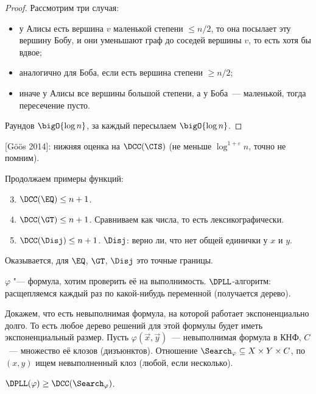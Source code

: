 \begin{proof}
    Рассмотрим три случая:
    \begin{itemize}
        \item у Алисы есть вершина $v$ маленькой степени $\leq n / 2$, то она посылает эту вершину
            Бобу, и они уменьшают граф до соседей вершины $v$, то есть хотя бы вдвое;
        \item аналогично для Боба, если есть вершина степени $\geq n / 2$;
        \item иначе у Алисы все вершины большой степени, а у Боба~--- маленькой, тогда пересечение пусто.
    \end{itemize}

    Раундов $\bigO{\log n}$, за каждый пересылаем $\bigO{\log n}$.
\end{proof}

[G{\"{o}}{\"{o}}s 2014]: нижняя оценка на $\DCC(\CIS)$ (не меньше $\log^{1 + \varepsilon} n$, точно не помним).

Продолжаем примеры функций:
\begin{enumerate}
        \setcounter{enumi}{2}
    \item $\DCC(\EQ) \leq n + 1$.
    \item $\DCC(\GT) \leq n + 1$.
        Сравниваем как числа, то есть лексикографически.
    \item $\DCC(\Disj) \leq n + 1$. $\Disj$: верно ли, что нет общей единички у $x$ и $y$.
\end{enumerate}

Оказывается, для $\EQ$, $\GT$, $\Disj$ это точные границы.



$\varphi$ "--- формула, хотим проверить её на выполнимость. $\DPLL$-алгоритм: расщепляемся каждый раз по
какой-нибудь переменной (получается дерево).

Докажем, что есть невыполнимая формула, на которой работает экспоненциально долго. То есть любое дерево
решений для этой формулы будет иметь экспоненциальный размер. Пусть $\varphi(\vec x, \vec y)$~---
невыполнимая формула в КНФ, $C$~--- множество её клозов (дизъюнктов). Отношение $\Search_{\varphi}
\subseteq X \times Y \times C$, по $(x, y)$ ищем невыполненный клоз (любой, если несколько).

\begin{theorem}
    \label{th:DPLL-and-Search}
    $\DPLL(\varphi) \geq \DCC(\Search_{\varphi})$.
\end{theorem}

